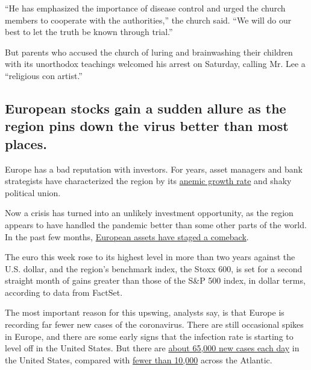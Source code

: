 ``He has emphasized the importance of disease control and urged the
church members to cooperate with the authorities,'' the church said.
``We will do our best to let the truth be known through trial.''

But parents who accused the church of luring and brainwashing their
children with its unorthodox teachings welcomed his arrest on Saturday,
calling Mr. Lee a ``religious con artist.''

\hypertarget{european-stocks-gain-a-sudden-allure-as-the-region-pins-down-the-virus-better-than-most-places}{%
\subsection{European stocks gain a sudden allure as the region pins down
the virus better than most
places.}\label{european-stocks-gain-a-sudden-allure-as-the-region-pins-down-the-virus-better-than-most-places}}

Europe has a bad reputation with investors. For years, asset managers
and bank strategists have characterized the region by its
\href{https://qz.com/1544961/the-euro-zone-economy-is-back-on-familiar-ground-slow-grinding-growth/}{anemic
growth rate} and shaky political union.

Now a crisis has turned into an unlikely investment opportunity, as the
region appears to have handled the pandemic better than some other parts
of the world. In the past few months,
\href{https://www.nytimes3xbfgragh.onion/2020/07/30/business/europes-markets-are-having-a-moment.html}{European
assets have staged a comeback}.

The euro this week rose to its highest level in more than two years
against the U.S. dollar, and the region's benchmark index, the Stoxx
600, is set for a second straight month of gains greater than those of
the S\&P 500 index, in dollar terms, according to data from FactSet.

The most important reason for this upswing, analysts say, is that Europe
is recording far fewer new cases of the coronavirus. There are still
occasional spikes in Europe, and there are some early signs that the
infection rate is starting to level off in the United States. But there
are
\href{https://www.nytimes3xbfgragh.onion/interactive/2020/us/coronavirus-us-cases.html?campaign_id=154\&emc=edit_cb_20200728\&instance_id=20725\&nl=coronavirus-briefing\&regi_id=137662381\&segment_id=34584\&te=1\&user_id=72eee90673e6857ae5a6e83e1981a59a}{about
65,000 new cases each day} in the United States, compared with
\href{https://www.ecdc.europa.eu/en/cases-2019-ncov-eueea}{fewer than
10,000} across the Atlantic.


